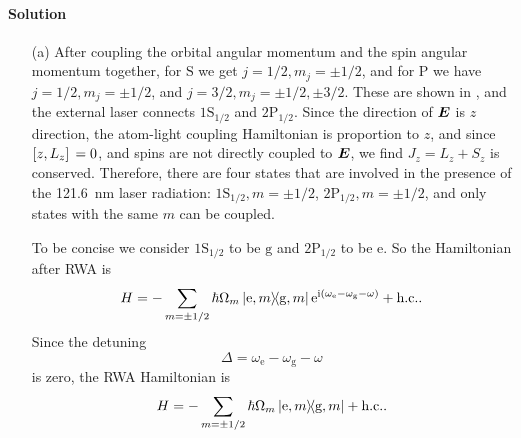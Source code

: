 \documentclass[hyperref, a4paper]{article}
\newcommand*{\ii}{\mathrm{i}}
\newcommand*{\ee}{\mathrm{e}}
\begin{document}
\paragraph{Solution} \begin{itemize}
\item[(a)] After coupling the orbital angular momentum and the spin angular momentum together, for $\text{S}$
we get $j=1/2, m_j = \pm 1/2$, and for $\text{P}$ we have $j = 1/2, m_j = \pm 1/2$, and 
$j = 3/2, m_j = \pm 1/2, \pm 3/2$. These are shown in , and the external laser connects
$1 \text{S}_{1/2}$ and $2 \text{P}_{1/2}$. Since the direction of $\vb*{E}$ is $z$ direction, the atom-light 
coupling Hamiltonian is proportion to $z$, and since $\comm*{z}{L_z} = 0$, and spins are not directly coupled 
to $\vb*{E}$, we find $J_z = L_z + S_z$ is conserved. Therefore, there are four 
states that are involved in the presence of the \SI{121.6}{nm} laser radiation: $1 \text{S}_{1/2}, m = \pm 1/2$, 
$2 \text{P}_{1/2}, m = \pm 1/2$, and only states with the same $m$ can be coupled. 

To be concise we consider $1 \text{S}_{1/2}$ to be $\text{g}$ and $2 \text{P}_{1/2}$ to be $\text{e}$.
So the Hamiltonian after RWA is 
\begin{equation}
    H = - \sum_{m = \pm 1/2} \hbar \Omega_{m} \dyad*{\text{e}, m}{\text{g}, m} \ee^{\ii (\omega_\text{e} - \omega_\text{g} - \omega)} + \text{h.c.}.
\end{equation}
Since the detuning 
\begin{equation}
    \Delta = \omega_\text{e} - \omega_\text{g} - \omega
\end{equation}
is zero, the RWA Hamiltonian is 
\begin{equation}
    H = - \sum_{m = \pm 1/2} \hbar \Omega_m \dyad*{\text{e}, m}{\text{g}, m} + \text{h.c.}.
\end{equation}


\end{itemize}
\end{document}
